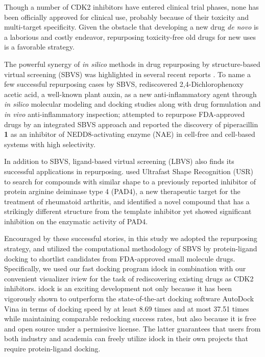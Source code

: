 \documentclass[10pt,letterpaper]{article}
\begin{document}
Though a number of CDK2 inhibitors have entered clinical trial phases, none has been officially approved for clinical use, probably because of their toxicity and multi-target specificity. Given the obstacle that developing a new drug \textit{de novo} is a laborious and costly endeavor, repurposing toxicity-free old drugs for new uses is a favorable strategy.

The powerful synergy of \textit{in silico} methods in drug repurposing by structure-based virtual screening (SBVS) was highlighted in several recent reports \cite{1384}. To name a few successful repurposing cases by SBVS, \cite{1507} rediscovered 2,4-Dichlorophenoxy acetic acid, a well-known plant auxin, as a new anti-inflammatory agent through \textit{in silico} molecular modeling and docking studies along with drug formulation and \textit{in vivo} anti-inflammatory inspection; \cite{1506} attempted to repurpose FDA-approved drugs by an integrated SBVS approach and reported the discovery of piperacillin \textbf{1} as an inhibitor of NEDD8-activating enzyme (NAE) in cell-free and cell-based systems with high selectivity.

In addition to SBVS, ligand-based virtual screening (LBVS) also finds its successful applications in repurposing. \cite{1504} used Ultrafast Shape Recognition (USR) \cite{1379} to search for compounds with similar shape to a previously reported inhibitor of protein arginine deiminase type 4 (PAD4), a new therapeutic target for the treatment of rheumatoid arthritis, and identified a novel compound that has a strikingly different structure from the template inhibitor yet showed significant inhibition on the enzymatic activity of PAD4.

Encouraged by these successful stories, in this study we adopted the repurposing strategy, and utilized the computational methodology of SBVS by protein-ligand docking to shortlist candidates from FDA-approved small molecule drugs. Specifically, we used our fast docking program idock \cite{1153,1362} in combination with our convenient visualizer iview \cite{1366} for the task of rediscovering existing drugs as CDK2 inhibitors. idock is an exciting development not only because it has been vigorously shown \cite{1362} to outperform the state-of-the-art docking software AutoDock Vina \cite{595} in terms of docking speed by at least 8.69 times and at most 37.51 times while maintaining comparable redocking success rates, but also because it is free and open source under a permissive license. The latter guarantees that users from both industry and academia can freely utilize idock in their own projects that require protein-ligand docking.
\end{document}

